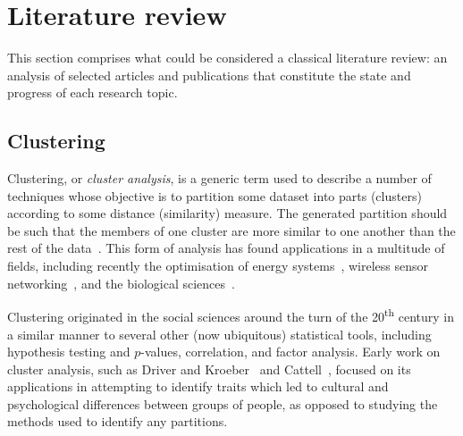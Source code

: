 \section{Literature review}\label{sec:review}

This section comprises what could be considered a classical literature review:
an analysis of selected articles and publications that constitute the state and
progress of each research topic.


\subsection{Clustering}\label{subsec:clustering}

Clustering, or \emph{cluster analysis}, is a generic term used to describe a
number of techniques whose objective is to partition some dataset into parts
(clusters) according to some distance (similarity) measure. The generated
partition should be such that the members of one cluster are more similar to one
another than the rest of the data~\cite{Everitt2011}. This form of analysis has
found applications in a multitude of fields, including recently the optimisation
of energy systems~\cite{Jing2019,Teichgraeber2019}, wireless sensor
networking~\cite{Goswami2019}, and the biological
sciences~\cite{Bulut2020,Kiselev2019}.

Clustering originated in the social sciences around the turn of the
20\textsuperscript{th} century in a similar manner to several other (now
ubiquitous) statistical tools, including hypothesis testing and \(p\)-values,
correlation, and factor analysis. Early work on cluster analysis, such as Driver
and Kroeber~\cite{Driver1932} and Cattell~\cite{Cattell1943}, focused on its
applications in attempting to identify traits which led to cultural and
psychological differences between groups of people, as opposed to studying the
methods used to identify any partitions.

